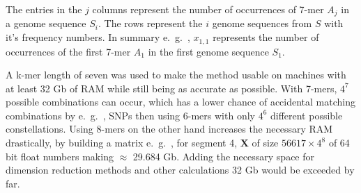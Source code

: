 The entries in the $j$ columns represent the number of occurrences of 7-mer $A_j$ in a genome sequence $S_i$. The rows represent the $i$ genome sequences from $S$ with it's frequency numbers. In summary e.~g.~, $x_{1,1}$ represents the number of occurrences of the first 7-mer $A_1$ in the first genome sequence $S_1$.

A k-mer length of seven was used to make the method usable on machines with at least 32 Gb of RAM while still being as accurate as possible. With 7-mers, $4^7$ possible combinations can occur, which has a lower chance of accidental matching combinations by e.~g.~, \glspl{SNP} then using 6-mers with only $4^6$ different possible constellations. Using 8-mers on the other hand increases the necessary RAM drastically, by building a matrix e.~g.~, for segment 4, $\mathbf{X}$ of size $56617 \times 4^8$ of 64 bit float numbers making $\approx$ 29.684 Gb. Adding the necessary space for dimension reduction methods and other calculations 32 Gb would be exceeded by far. 
